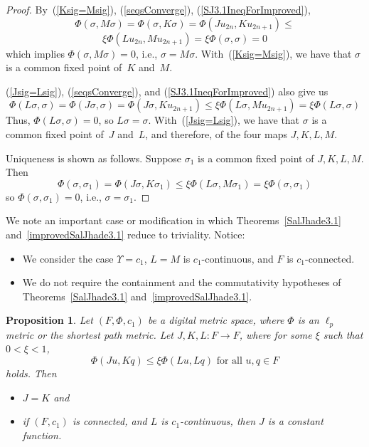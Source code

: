 \documentclass{article}
\newtheorem{prop}[thm]{Proposition}
\numberwithin{thm}{section}
\begin{document}
\begin{proof}
By~(\ref{Ksig=Msig}), 
(\ref{seqsConverge}), (\ref{SJ3.1IneqForImproved}),
\[ \Phi(\sigma,M\sigma)
  = \Phi(\sigma,K\sigma)=\Phi(Ju_{2n},Ku_{2n+1}) \le 
  \]
\[  \xi \Phi(Lu_{2n},Mu_{2n+1}) = \xi \Phi(\sigma,\sigma)=0
\]
which implies $\Phi(\sigma,M\sigma) = 0$, i.e., $\sigma = M\sigma$. With~(\ref{Ksig=Msig}), we
have that $\sigma$ is a
common fixed point of~$K$
and~$M$.

(\ref{Jsig=Lsig}), 
(\ref{seqsConverge}), and
(\ref{SJ3.1IneqForImproved}) also give us
\[ \Phi(L\sigma,\sigma)=
\Phi(J\sigma, \sigma) = \Phi(J\sigma,Ku_{2n+1}) \le \xi \Phi(L\sigma,Mu_{2n+1}) =
\xi \Phi(L\sigma, \sigma)
\]
Thus, $\Phi(L\sigma, \sigma)=0$, so
$L\sigma = \sigma$. With~(\ref{Jsig=Lsig}), we
have that $\sigma$
is a common fixed point
of~$J$ and~$L$, and therefore, of
the four maps $J,K,L,M$.

Uniqueness is shown as
follows. Suppose
$\sigma_1$ is a common
fixed point of $J,K,L,M$.
Then
\[ \Phi(\sigma,\sigma_1)
= \Phi(J\sigma,K\sigma_1)
\le \xi \Phi(L\sigma,M\sigma_1)
= \xi \Phi(\sigma,\sigma_1)
\]
so $\Phi(\sigma,\sigma_1) = 0$, i.e., $\sigma = \sigma_1$.
\end{proof}

We note an important case or modification
in which Theorems~\ref{SalJhade3.1} and~\ref{improvedSalJhade3.1}
reduce to triviality. Notice:
\begin{itemize}
    \item We consider the
    case $\Upsilon=c_1$,
    $L=M$ is $c_1$-continuous, and $F$
    is $c_1$-connected.
    \item We do not require the containment and the
    commutativity hypotheses of
    Theorems~\ref{SalJhade3.1} and~\ref{improvedSalJhade3.1}.
\end{itemize}

\begin{prop}
        Let $(F,\Phi,c_1)$
    be a digital
    metric space, where
    $\Phi$ is an $\ell_p$ metric or
    the shortest path metric. Let
    $J,K,L: F \to F$,
    where for some $\xi$
    such that $0 < \xi < 1$,
\begin{equation}
\label{L=M}
     \Phi(Ju,Kq) \le
      \xi \Phi(Lu,Lq)
      \mbox{ for all } u,q \in F
\end{equation} 
holds. Then 
\begin{itemize}
    \item $J=K$ and
    \item if $(F,c_1)$ is connected,
and $L$ is $c_1$-continuous, then $J$
    is a constant function.
\end{itemize}  
\end{prop}
\end{document}

